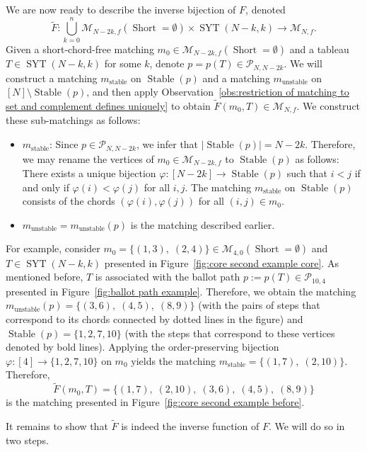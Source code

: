 \documentclass[ALCO]{cedram}
\newcommand{\Syt}{\operatorname{SYT}}
\newcommand{\Short}{\operatorname{Short}}
\newcommand{\Stable}{\operatorname{Stable}}
\newcommand{\M}{\mathcal{M}}
\newcommand{\Pcal}{\mathcal{P}}
\begin{document}
We are now ready to describe the inverse bijection of $F$, denoted
\[
    \tilde{F}:\bigcup_{k=0}^n \M_{N-2k,f}(\Short = \emptyset) \times \Syt(N-k,k) \to \M_{N,f}.
\]
Given a short-chord-free matching $m_0 \in \M_{N-2k,f}(\Short = \emptyset)$ and a tableau $T \in \Syt(N-k,k)$ for some $k$, denote $p = p(T) \in \Pcal_{N,N-2k}$.
We will construct a matching $m_{\text{stable}}$ on $\Stable(p)$ and a matching $m_{\text{unstable}}$ on $[N]\setminus\Stable(p)$, and then apply Observation~\ref{obs:restriction of matching to set and complement defines uniquely} to obtain $\tilde{F}(m_0,T) \in \M_{N,f}$. We construct these sub-matchings as follows:
\begin{itemize}
    \item $m_{\text{stable}}$: Since $p \in \Pcal_{N,N-2k}$, we infer that $\left|\Stable(p)\right| = N-2k$. Therefore, we may rename the vertices of $m_0 \in \M_{N-2k,f}$ to $\Stable(p)$ as follows: There exists a unique bijection $\varphi:[N-2k] \to \Stable(p)$ such that $i < j$ if and only if $\varphi(i) <\varphi(j)$ for all $i,j$. The matching $m_{\text{stable}}$ on $\Stable(p)$ consists of the chords $(\varphi(i), \varphi(j))$ for all $(i,j) \in m_0$.
    \item $m_{\text{unstable}} = m_{\text{unstable}}(p)$ is the matching described earlier.
\end{itemize}

For example, consider $m_0 = \{(1,3),\; (2,4)\} \in \M_{4,0}(\Short = \emptyset)$ and $T \in \Syt(N-k,k)$ presented in Figure~\ref{fig:core second example core}. As mentioned before, $T$ is associated with the ballot path $p := p(T) \in \Pcal_{10,4}$ presented in Figure~\ref{fig:ballot path example}. Therefore, we obtain the matching $m_{\text{unstable}}(p) = \{(3,6),\; (4,5),\; (8,9)\}$ (with the pairs of steps that correspond to its chords connected by dotted lines in the figure) and $\Stable(p) = \{1,2,7,10\}$ (with the steps that correspond to these vertices denoted by bold lines). Applying the order-preserving bijection $\varphi:[4] \to \{1,2,7,10\}$ on $m_0$ yields the matching $m_{\text{stable}} = \{(1,7),\; (2,10)\}$. Therefore,
\[
    \tilde{F}(m_0,T) = \{(1,7),\; (2,10),\; (3,6),\; (4,5),\; (8,9)\}
\]
is the matching presented in Figure~\ref{fig:core second example before}.

It remains to show that $\tilde{F}$ is indeed the inverse function of $F$. We will do so in two steps.
\end{document}
